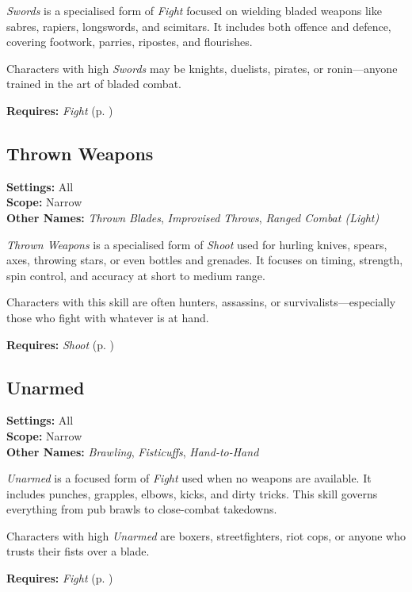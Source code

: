 \emph{Swords} is a specialised form of \emph{Fight} focused on wielding bladed weapons like sabres, rapiers, longswords, and scimitars. It includes both offence and defence, covering footwork, parries, ripostes, and flourishes.

Characters with high \emph{Swords} may be knights, duelists, pirates, or ronin—anyone trained in the art of bladed combat.

\vspace{0.5\baselineskip}
\noindent\textbf{Requires:} \emph{Fight} (p. \pageref{skill:fight})


\subsection{Thrown Weapons}\label{skill:thrown-weapons}
\textbf{Settings:} All\\
\textbf{Scope:} Narrow\\
\textbf{Other Names:} \emph{Thrown Blades}, \emph{Improvised Throws}, \emph{Ranged Combat (Light)}\\
\vspace{\baselineskip}

\emph{Thrown Weapons} is a specialised form of \emph{Shoot} used for hurling knives, spears, axes, throwing stars, or even bottles and grenades. It focuses on timing, strength, spin control, and accuracy at short to medium range.

Characters with this skill are often hunters, assassins, or survivalists—especially those who fight with whatever is at hand.

\vspace{0.5\baselineskip}
\noindent\textbf{Requires:} \emph{Shoot} (p. \pageref{skill:shoot})



\subsection{Unarmed}\label{skill:unarmed}
\textbf{Settings:} All\\
\textbf{Scope:} Narrow\\
\textbf{Other Names:} \emph{Brawling}, \emph{Fisticuffs}, \emph{Hand-to-Hand}\\
\vspace{\baselineskip}

\emph{Unarmed} is a focused form of \emph{Fight} used when no weapons are available. It includes punches, grapples, elbows, kicks, and dirty tricks. This skill governs everything from pub brawls to close-combat takedowns.

Characters with high \emph{Unarmed} are boxers, streetfighters, riot cops, or anyone who trusts their fists over a blade.

\vspace{0.5\baselineskip}
\noindent\textbf{Requires:} \emph{Fight} (p. \pageref{skill:fight})

